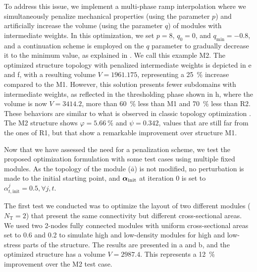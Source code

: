 To address this issue, we implement a multi-phase \gls{ramp} interpolation where we simultaneously penalize mechanical properties (using the parameter $p$) and artificially increase the volume (using the parameter $q$) of modules with intermediate weights. In this optimization, we set $p=8$, $q_{0}=0$, and $q_{\text{min}}=-0.8$, and a continuation scheme is employed on the $q$ parameter to gradually decrease it to the minimum value, as explained in . We call this example M2. The optimized structure topology with penalized intermediate weights is depicted in e and f, with a resulting volume $V = 1961.175$, representing a \qty{25}{\%} increase compared to the M1. However, this solution presents fewer subdomains with intermediate weights, as reflected in the thresholding phase shown in h, where the volume is now $V=3414.2$, more than \qty{60}{\%} less than M1 and \qty{70}{\%} less than R2. These behaviors are similar to what is observed in classic topology optimization . The M2 structure shows $\varphi=\qty{5.66}{\percent}$ and $\psi=0.342$, values that are still far from the ones of R1, but that show a remarkable improvement over structure M1.

Now that we have assessed the need for a penalization scheme, we test the proposed optimization formulation with some test cases using multiple fixed modules. As the topology of the module ($\bar{a}$) is not modified, no perturbation is made to the initial starting point, and $\bm{\alpha}_\text{init}$ at iteration 0 is set to $\alpha_{t,\text{init}}^j = 0.5, \forall j, t$. 

The first test we conducted was to optimize the layout of two different modules ($N_\text{T}=2$) that present the same connectivity but different cross-sectional areas. We used two 2-nodes fully connected modules with uniform cross-sectional areas set to 0.6 and 0.2 to simulate high and low-density modules for high and low-stress parts of the structure. The results are presented in a and b, and the optimized structure has a volume $V = 2987.4$. This represents a \qty{12}{\%} improvement over the M2 test case.

